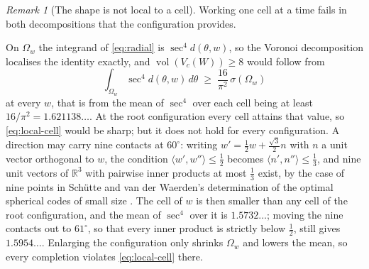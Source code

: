 \documentclass[11pt,reqno]{amsart}
\renewcommand{\_}{\origunderscore\allowbreak}
\numberwithin{equation}{section}
\theoremstyle{plain}
\theoremstyle{definition}
\theoremstyle{remark}
\newtheorem{remark}[thm]{Remark}
\DeclareMathOperator{\vol}{vol}
\begin{document}
\begin{remark}[The shape is not local to a cell]\label{rem:no-local-cell}
Working one cell at a time fails in both decompositions that the
configuration provides.

On $\Omega_w$ the integrand of \eqref{eq:radial} is $\sec^4d(\theta,w)$,
so the Voronoi decomposition localises the identity exactly, and
$\vol(V_c(W))\ge8$ would follow from
\begin{equation}\label{eq:local-cell}
  \int_{\Omega_w}\sec^4 d(\theta,w)\,d\theta
  \;\ge\;\frac{16}{\pi^2}\,\sigma(\Omega_w)
\end{equation}
at every $w$, that is from the mean of $\sec^4$ over each cell being at
least $16/\pi^2=1.621138\ldots$. At the root configuration every cell
attains that value, so \eqref{eq:local-cell} would be sharp; but it does
not hold for every configuration. A direction may carry nine contacts at $60^\circ$: writing
$w'=\tfrac12 w+\tfrac{\sqrt3}{2}n$ with $n$ a unit vector orthogonal to
$w$, the condition $\langle w',w''\rangle\le\tfrac12$ becomes
$\langle n',n''\rangle\le\tfrac13$, and nine unit vectors of
$\mathbb{R}^3$ with pairwise inner products at most $\tfrac13$ exist, by
the case of nine points in Sch\"utte and van der Waerden's determination
of the optimal spherical codes of small size \cite{SW51}. The cell of
$w$ is then smaller than any cell of the root configuration, and the
mean of $\sec^4$ over it is $1.5732\ldots$; moving the nine contacts out
to $61^\circ$, so that every inner product is strictly below
$\tfrac12$, still gives $1.5954\ldots$. Enlarging the configuration only
shrinks $\Omega_w$ and lowers the mean, so every completion violates
\eqref{eq:local-cell} there.


\end{remark}
\end{document}
